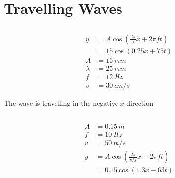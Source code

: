 \documentclass{article}
\begin{document}
\section{Travelling Waves}

\subsection{}

\begin{align*}
  y       & = A \cos \left( \frac{2 \pi}{\lambda} x + 2 \pi f t \right) \\
          & = 15 \cos (0.25 x + 75 t)                                   \\
  A       & = \qty{15}{mm}                                              \\
  \lambda & = \qty{25}{mm}                                              \\
  f       & = \qty{12}{Hz}                                              \\
  v       & = \qty{30}{cm/s}
\end{align*}

The wave is travelling in the negative $x$ direction

\subsection{}

\begin{align*}
  A & = \qty{0.15}{m}                                           \\
  f & = \qty{10}{Hz}                                            \\
  v & = \qty{50}{m/s}                                           \\
  y & = A \cos \left( \frac{2 \pi}{v / f} x - 2 \pi f t \right) \\
    & = 0.15 \cos (1.3 x - 63 t)
\end{align*}

\subsection{}
\end{document}
